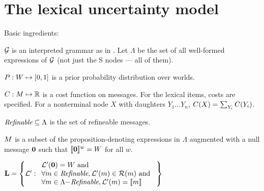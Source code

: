 \documentclass{article}
\begin{document}

\section{The lexical uncertainty model}\label{sec:model}

\begin{examples}

\item\label{modobjects} Basic ingredients:
  \begin{examples}
  \item $\mathcal{G}$ is an interpreted grammar as in . Let
    $\Lambda$ be the set of all well-formed expressions of $\mathcal{G}$
    (not just the S nodes --- all of them).

  \item $P : W \mapsto [0,1]$ is a prior probability
    distribution over worlds.

  \item $C : M \mapsto \mathbb{R}$ is a cost function on
    messages.  For the lexical items, costs are specified. For a
    nonterminal node $X$ with daughters $Y_{1} \ldots Y_{n}$,
    $C(X) = \sum_{Y_{i}}C(Y_{i})$.

  \item\label{enrichable}%
    $\textit{Refinable} \subseteq \Lambda$ is the set of refineable messages.

  \item $M$ is a subset of the proposition-denoting
    expressions in $\Lambda$ augmented with a null message $\mathbf{0}$
    such that $\llbracket\text{$\mathbf{0}$}\rrbracket^{w} = W$ for all $w$.

  \item\label{lexset}%
    $\mathbf{L} = \left\{ \mathcal{L}' :       
      \begin{array}[c]{l}
        \mathcal{L}'(\mathbf{0}) = W \text{ and } \\ 
        \forall m \in \textit{Refinable}, \mathcal{L}'(m) \in \mathcal{R}(m) \text{ and } \\
        \forall m \in \Lambda{-}\textit{Refinable}, \mathcal{L}'(m) = \llbracket m\rrbracket
      \end{array} \right\}$
  

\end{examples}
\end{examples}
\end{document}

